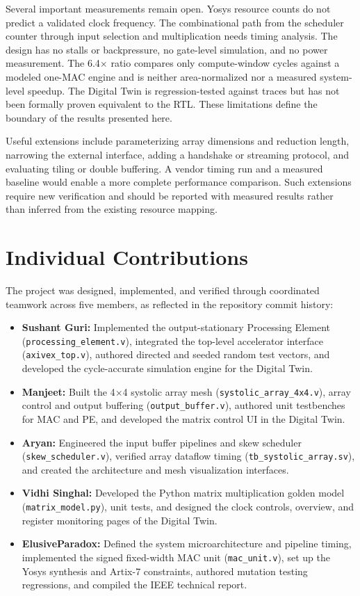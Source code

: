 \documentclass[conference]{IEEEtran}
\begin{document}
Several important measurements remain open. Yosys resource counts do not predict a validated clock frequency.
The combinational path from the scheduler counter through input selection and multiplication needs timing analysis.
The design has no stalls or backpressure, no gate-level simulation, and no power measurement. The 6.4$\times$ ratio
compares only compute-window cycles against a modeled one-MAC engine and is neither area-normalized nor a measured
system-level speedup. The Digital Twin is regression-tested against traces but has not been formally proven equivalent
to the RTL. These limitations define the boundary of the results presented here.

Useful extensions include parameterizing array dimensions and reduction length, narrowing the external interface,
adding a handshake or streaming protocol, and evaluating tiling or double buffering. A vendor timing run and a
measured baseline would enable a more complete performance comparison. Such extensions require new verification and
should be reported with measured results rather than inferred from the existing resource mapping.

\section{Individual Contributions}
The project was designed, implemented, and verified through coordinated teamwork across five members, as reflected in the repository commit history:
\begin{itemize}
    \item \textbf{Sushant Guri:} Implemented the output-stationary Processing Element (\texttt{processing\_element.v}), integrated the top-level accelerator interface (\texttt{axivex\_top.v}), authored directed and seeded random test vectors, and developed the cycle-accurate simulation engine for the Digital Twin.
    \item \textbf{Manjeet:} Built the 4$\times$4 systolic array mesh (\texttt{systolic\_array\_4x4.v}), array control and output buffering (\texttt{output\_buffer.v}), authored unit testbenches for MAC and PE, and developed the matrix control UI in the Digital Twin.
    \item \textbf{Aryan:} Engineered the input buffer pipelines and skew scheduler (\texttt{skew\_scheduler.v}), verified array dataflow timing (\texttt{tb\_systolic\_array.sv}), and created the architecture and mesh visualization interfaces.
    \item \textbf{Vidhi Singhal:} Developed the Python matrix multiplication golden model (\texttt{matrix\_model.py}), unit tests, and designed the clock controls, overview, and register monitoring pages of the Digital Twin.
    \item \textbf{ElusiveParadox:} Defined the system microarchitecture and pipeline timing, implemented the signed fixed-width MAC unit (\texttt{mac\_unit.v}), set up the Yosys synthesis and Artix-7 constraints, authored mutation testing regressions, and compiled the IEEE technical report.
\end{itemize}
\end{document}
